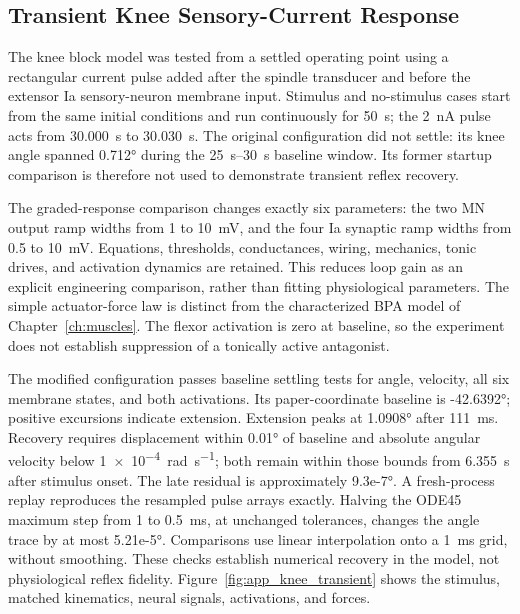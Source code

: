 \subsection{Transient Knee Sensory-Current Response}\label{sec:app_knee_transient}

The knee block model was tested from a settled operating point using a rectangular current pulse added after the spindle transducer and before the extensor Ia sensory-neuron membrane input. Stimulus and no-stimulus cases start from the same initial conditions and run continuously for \qty{50}{\second}; the \qty{2}{\nano\ampere} pulse acts from \qty{30.000}{\second} to \qty{30.030}{\second}. The original configuration did not settle: its knee angle spanned \ang{0.712} during the \qtyrange{25}{30}{\second} baseline window. Its former startup comparison is therefore not used to demonstrate transient reflex recovery.

The graded-response comparison changes exactly six parameters: the two MN output ramp widths from 1 to \qty{10}{\milli\volt}, and the four Ia synaptic ramp widths from 0.5 to \qty{10}{\milli\volt}. Equations, thresholds, conductances, wiring, mechanics, tonic drives, and activation dynamics are retained. This reduces loop gain as an explicit engineering comparison, rather than fitting physiological parameters. The simple actuator-force law is distinct from the characterized BPA model of Chapter~\ref{ch:muscles}. The flexor activation is zero at baseline, so the experiment does not establish suppression of a tonically active antagonist.

The modified configuration passes baseline settling tests for angle, velocity, all six membrane states, and both activations. Its paper-coordinate baseline is \ang{-42.6392}; positive excursions indicate extension. Extension peaks at \ang{1.0908} after \qty{111}{\milli\second}. Recovery requires displacement within \ang{0.01} of baseline and absolute angular velocity below \qty{1e-4}{\radian\per\second}; both remain within those bounds from \qty{6.355}{\second} after stimulus onset. The late residual is approximately \ang{9.3e-7}. A fresh-process replay reproduces the resampled pulse arrays exactly. Halving the ODE45 maximum step from 1 to \qty{0.5}{\milli\second}, at unchanged tolerances, changes the angle trace by at most \ang{5.21e-5}. Comparisons use linear interpolation onto a \qty{1}{\milli\second} grid, without smoothing. These checks establish numerical recovery in the model, not physiological reflex fidelity. Figure~\ref{fig:app_knee_transient} shows the stimulus, matched kinematics, neural signals, activations, and forces.

